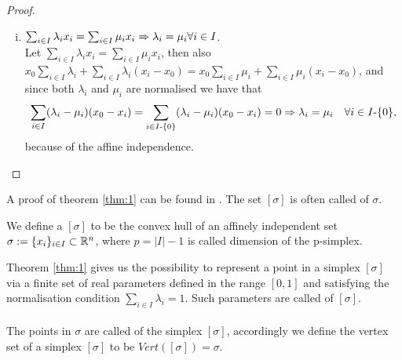 \documentclass[../1.tex]{subfiles}
\begin{document}
\begin{proof}
\begin{enumerate}[(i)]
            \item $\sum_{i \in I} \lambda_i x_i = \sum_{i \in I} \mu_i x_i \Rightarrow \lambda_i = \mu_i \forall i \in I$.\\
            Let $\sum_{i \in I} \lambda_i x_i = \sum_{i \in I} \mu_i x_i$, then also $x_0\sum_{i \in I} \lambda_i + \sum_{i \in I} \lambda_i(x_i-x_0) = 
            x_0\sum_{i \in I} \mu_i +\sum_{i \in I} \mu_i (x_i - x_0)$, and since both $\lambda_i$ and $\mu_i$ are normalised we have that
            \[ \sum_{i \in I} (\lambda_i - \mu_i) (x_0 - x_i) = \sum_{i \in I \text{-} \{0\}} (\lambda_i - \mu_i) (x_0 - x_i) = 0 \Rightarrow \lambda_i = \mu_i \quad \forall i \in I \text{-} \{0\},\]
            because of the affine independence. \qedhere

        \end{enumerate}
    \end{proof}

    A proof of theorem \ref{thm:1} can be found in \cite{singerthorpe}.
    The set $[\sigma]$ is often called  of $\sigma$.
    


    \begin{defn}
        We define a  $[\sigma]$ to be the convex hull of an affinely independent set $\sigma := \{x_i\}_{i \in I} \subset \mathbb{R}^n$,
        where $p = |I|-1$ is called dimension of the p-simplex. 
    \end{defn}

    Theorem \ref{thm:1} gives us the possibility to represent a point in a simplex $[\sigma]$ via a finite set of real parameters defined in the range $[0,1]$
    and satisfying the normalisation condition $\sum_{i \in I } \lambda_i = 1$. Such parameters are called  of $[\sigma]$.\\
    \hfill \\
    The points in $\sigma$ are called  of the simplex $[\sigma]$, accordingly we define the vertex set of a simplex $[\sigma]$ to be 
    $Vert([\sigma]) = \sigma$.
    
\end{document}
